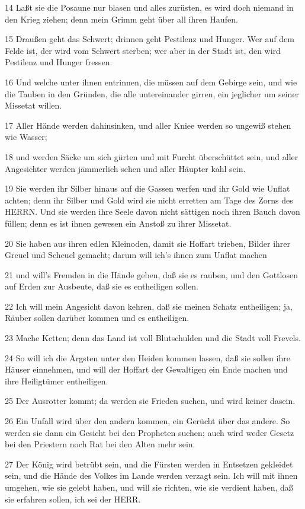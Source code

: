 \par 14 Laßt sie die Posaune nur blasen und alles zurüsten, es wird doch niemand in den Krieg ziehen; denn mein Grimm geht über all ihren Haufen.
\par 15 Draußen geht das Schwert; drinnen geht Pestilenz und Hunger. Wer auf dem Felde ist, der wird vom Schwert sterben; wer aber in der Stadt ist, den wird Pestilenz und Hunger fressen.
\par 16 Und welche unter ihnen entrinnen, die müssen auf dem Gebirge sein, und wie die Tauben in den Gründen, die alle untereinander girren, ein jeglicher um seiner Missetat willen.
\par 17 Aller Hände werden dahinsinken, und aller Kniee werden so ungewiß stehen wie Wasser;
\par 18 und werden Säcke um sich gürten und mit Furcht überschüttet sein, und aller Angesichter werden jämmerlich sehen und aller Häupter kahl sein.
\par 19 Sie werden ihr Silber hinaus auf die Gassen werfen und ihr Gold wie Unflat achten; denn ihr Silber und Gold wird sie nicht erretten am Tage des Zorns des HERRN. Und sie werden ihre Seele davon nicht sättigen noch ihren Bauch davon füllen; denn es ist ihnen gewesen ein Anstoß zu ihrer Missetat.
\par 20 Sie haben aus ihren edlen Kleinoden, damit sie Hoffart trieben, Bilder ihrer Greuel und Scheuel gemacht; darum will ich's ihnen zum Unflat machen
\par 21 und will's Fremden in die Hände geben, daß sie es rauben, und den Gottlosen auf Erden zur Ausbeute, daß sie es entheiligen sollen.
\par 22 Ich will mein Angesicht davon kehren, daß sie meinen Schatz entheiligen; ja, Räuber sollen darüber kommen und es entheiligen.
\par 23 Mache Ketten; denn das Land ist voll Blutschulden und die Stadt voll Frevels.
\par 24 So will ich die Ärgsten unter den Heiden kommen lassen, daß sie sollen ihre Häuser einnehmen, und will der Hoffart der Gewaltigen ein Ende machen und ihre Heiligtümer entheiligen.
\par 25 Der Ausrotter kommt; da werden sie Frieden suchen, und wird keiner dasein.
\par 26 Ein Unfall wird über den andern kommen, ein Gerücht über das andere. So werden sie dann ein Gesicht bei den Propheten suchen; auch wird weder Gesetz bei den Priestern noch Rat bei den Alten mehr sein.
\par 27 Der König wird betrübt sein, und die Fürsten werden in Entsetzen gekleidet sein, und die Hände des Volkes im Lande werden verzagt sein. Ich will mit ihnen umgehen, wie sie gelebt haben, und will sie richten, wie sie verdient haben, daß sie erfahren sollen, ich sei der HERR.

